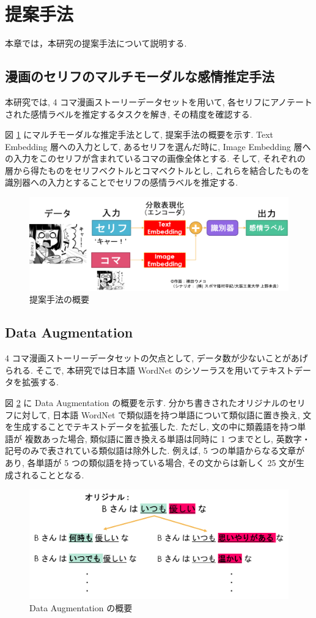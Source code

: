\newpage
\changeindent{0cm}
\section{提案手法}
\changeindent{2cm}

本章では，本研究の提案手法について説明する.

\changeindent{0cm}
\subsection{漫画のセリフのマルチモーダルな感情推定手法}
\changeindent{2cm}

本研究では, 4 コマ漫画ストーリーデータセットを用いて,
各セリフにアノテートされた感情ラベルを推定するタスクを解き, その精度を確認する.

図 \ref{fig:teian} にマルチモーダルな推定手法として, 提案手法の概要を示す.
Text Embedding 層への入力として, あるセリフを選んだ時に, Image Embedding 層への入力をこのセリフが含まれているコマの画像全体とする. そして, それぞれの層から得たものをセリフベクトルとコマベクトルとし, これらを結合したものを識別器への入力とすることでセリフの感情ラベルを推定する.

\begin{figure}[h]
  \centering
  \includegraphics[width=0.8\hsize]{doc/figures/teian.png}
  \caption{提案手法の概要}
  \label{fig:teian}
\end{figure}

\changeindent{0cm}
\subsection{Data Augmentation}
\changeindent{2cm}

4 コマ漫画ストーリーデータセットの欠点として, データ数が少ないことがあげられる.
そこで, 本研究では日本語 WordNet \cite{word_net_jp} のシソーラスを用いてテキストデータを拡張する.

図 \ref{fig:data_aug} に Data Augmentation の概要を示す.
分かち書きされたオリジナルのセリフに対して, 日本語 WordNet で類似語を持つ単語について類似語に置き換え, 文を生成することでテキストデータを拡張した. ただし, 文の中に類義語を持つ単語が
複数あった場合, 類似語に置き換える単語は同時に 1 つまでとし, 英数字・記号のみで表されている類似語は除外した. 例えば, 5 つの単語からなる文章があり,
各単語が 5 つの類似語を持っている場合, その文からは新しく 25 文が生成されることとなる.

\begin{figure}[h]
  \centering
  \includegraphics[width=0.8\hsize]{doc/figures/data_aug.png}
  \caption{Data Augmentation の概要}
  \label{fig:data_aug}
\end{figure}
